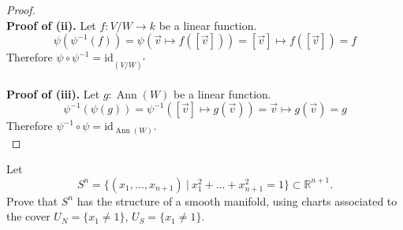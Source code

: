 \documentclass{article}
\newenvironment{problem}[2][Problem]{\begin{trivlist}
\item[\hskip \labelsep {\bfseries #1}\hskip \labelsep {\bfseries #2.}]}{\end{trivlist}}
\begin{document}
\begin{proof}
  \\\textbf{Proof of (ii).}
  Let $f: V/W \rightarrow k$ be a linear function.
    \[
      \psi(\psi^{-1}(f))
      = \psi(\vec{v} \mapsto f([\vec{v}]))
      = [\vec{v}] \mapsto f([\vec{v}])
      = f
    \] Therefore $\psi \circ \psi^{-1} = \mathrm{id}_{(V/W)^*}$ \\
  \\\textbf{Proof of (iii).}
  Let $g: \operatorname{Ann}(W)$ be a linear function. \[
    \psi^{-1}(\psi(g))
    = \psi^{-1}([\vec{v}] \mapsto g(\vec{v}))
    = \vec{v} \mapsto g(\vec{v})
    = g
  \] Therefore $\psi^{-1} \circ \psi = \mathrm{id}_{\operatorname{Ann}(W)}$. \\
\end{proof}

\pagebreak

\begin{problem}{2}
  Let \[
    S^n = \{
      (x_1, \hdots, x_{n + 1})\ |\
      x_1^2 + \hdots + x_{n + 1}^2 = 1
    \} \subset \mathbb{R}^{n + 1}.
  \] Prove that $S^n$ has the structure of a smooth manifold,
  using charts associated to the cover $U_N = \{ x_1 \not= 1 \}$, $U_S = \{ x_1 \not= 1 \}$.
\end{problem}
\end{document}
